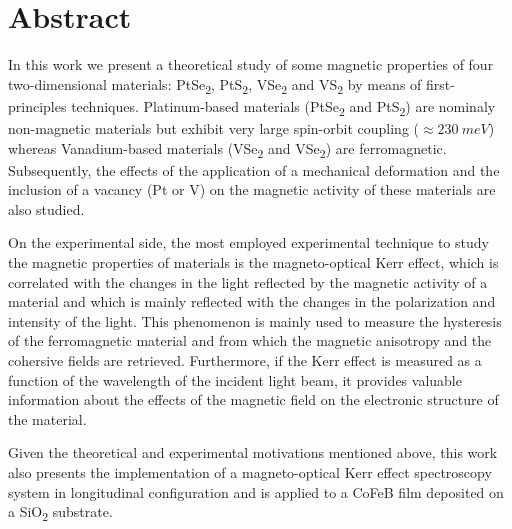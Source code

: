  \chapter{\centering Abstract}
 In this work we present a theoretical study of some magnetic properties of four two-dimensional materials: PtSe\textsubscript{2}, PtS\textsubscript{2}, VSe\textsubscript{2} and VS\textsubscript{2} by means of first-principles techniques. Platinum-based materials (PtSe\textsubscript{2} and PtS\textsubscript{2}) are nominaly non-magnetic materials but exhibit  very large spin-orbit coupling ($\approx 230~meV$) whereas Vanadium-based materials (VSe\textsubscript{2} and VSe\textsubscript{2}) are ferromagnetic. Subsequently, the effects of the application of a mechanical deformation and the inclusion of a vacancy (Pt or V) on the magnetic activity of these materials are also studied.
\newline
 \par On the experimental side, the most employed experimental technique to study the magnetic properties of materials is the magneto-optical Kerr effect, which is correlated with the changes in the light reflected by the magnetic activity of a material and which is mainly reflected with the changes in the polarization and intensity of the light. This phenomenon is mainly used to measure the hysteresis of the ferromagnetic material and from which the magnetic anisotropy and the cohersive fields are retrieved. Furthermore, if the Kerr effect is measured as a function of the wavelength of the incident light beam, it provides valuable information about the effects of the magnetic field on the electronic structure of the material. 
\newline
 \par Given the theoretical and experimental motivations mentioned above, this work also presents the implementation of a magneto-optical Kerr effect spectroscopy system in longitudinal configuration and is applied  to a CoFeB film deposited on a SiO\textsubscript{2} substrate.

